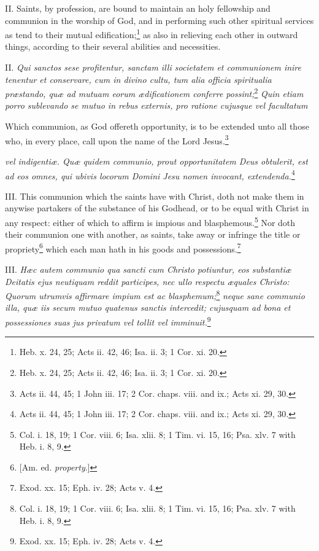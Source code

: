 II. Saints, by profession, are bound to maintain an holy fellowship and communion in the worship of God, and in performing such other spiritual services as tend to their mutual edification;\footnote{Heb. x. 24, 25; Acts ii. 42, 46; Isa. ii. 3; 1 Cor. xi. 20.} as also in relieving each other in outward things, according to their several abilities and necessities.

II. \emph{Qui sanctos sese profitentur, sanctam illi societatem et communionem inire tenentur et conservare, cum in divino cultu, tum alia officia spiritualia præstando, quæ ad mutuam eorum ædificationem conferre possint;}\footnote{Heb. x. 24, 25; Acts ii. 42, 46; Isa. ii. 3; 1 Cor. xi. 20.}\emph{ Quin etiam porro sublevando se mutuo in rebus externis, pro ratione cujusque vel facultatum }

Which communion, as God offereth opportunity, is to be extended unto all those who, in every place, call upon the name of the Lord Jesus.\footnote{Acts ii. 44, 45; 1 John iii. 17; 2 Cor. chaps. viii. and ix.; Acts xi. 29, 30.}

\emph{vel indigentiæ. Quæ quidem communio, prout opportunitatem Deus obtulerit, est ad eos omnes, qui ubivis locorum Domini Jesu nomen invocant, extendenda.}\footnote{Acts ii. 44, 45; 1 John iii. 17; 2 Cor. chaps. viii. and ix.; Acts xi. 29, 30.}

III. This communion which the saints have with Christ, doth not make them in anywise partakers of the substance of his Godhead, or to be equal with Christ in any respect: either of which to affirm is impious and blasphemous.\footnote{Col. i. 18, 19; 1 Cor. viii. 6; Isa. xlii. 8; 1 Tim. vi. 15, 16; Psa. xlv. 7 with Heb. i. 8, 9.} Nor doth their communion one with another, as saints, take away or infringe the title or propriety\footnote{[Am. ed. \emph{property}.]} which each man hath in his goods and possessions.\footnote{Exod. xx. 15; Eph. iv. 28; Acts v. 4.}

III. \emph{Hæc autem communio qua sancti cum Christo potiuntur, eos substantiæ Deitatis ejus neutiquam reddit participes, nec ullo respectu æquales Christo: Quorum utrumvis affirmare impium est ac blasphemum;}\footnote{Col. i. 18, 19; 1 Cor. viii. 6; Isa. xlii. 8; 1 Tim. vi. 15, 16; Psa. xlv. 7 with Heb. i. 8, 9.}\emph{ neque sane communio illa, quæ iis secum mutuo quatenus sanctis intercedit; cujusquam ad bona et possessiones suas jus privatum vel tollit vel imminuit.}\footnote{Exod. xx. 15; Eph. iv. 28; Acts v. 4.}


